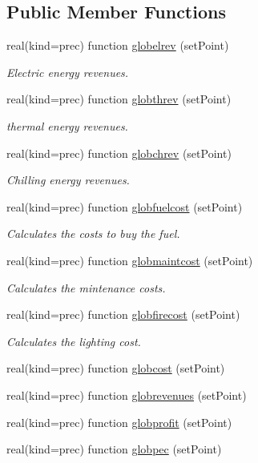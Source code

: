 \subsection*{Public Member Functions}
\begin{DoxyCompactItemize}
\item 
real(kind=prec) function \hyperlink{classglobalresults_ac009a3d3d776d80a58d143c137dd9426}{globelrev} (set\-Point)
\begin{DoxyCompactList}\small\item\em Electric energy revenues. \end{DoxyCompactList}\item 
real(kind=prec) function \hyperlink{classglobalresults_aed1df63c124b3ac76809e37374672f26}{globthrev} (set\-Point)
\begin{DoxyCompactList}\small\item\em thermal energy revenues. \end{DoxyCompactList}\item 
real(kind=prec) function \hyperlink{classglobalresults_a972ef181b25a59b4f9325c85b021149e}{globchrev} (set\-Point)
\begin{DoxyCompactList}\small\item\em Chilling energy revenues. \end{DoxyCompactList}\item 
real(kind=prec) function \hyperlink{classglobalresults_a5e2fcd8b1f2a5d2ffa7be6e316a54d8d}{globfuelcost} (set\-Point)
\begin{DoxyCompactList}\small\item\em Calculates the costs to buy the fuel. \end{DoxyCompactList}\item 
real(kind=prec) function \hyperlink{classglobalresults_a94041d2c7b3dd5969c1abcf1e9546e65}{globmaintcost} (set\-Point)
\begin{DoxyCompactList}\small\item\em Calculates the mintenance costs. \end{DoxyCompactList}\item 
real(kind=prec) function \hyperlink{classglobalresults_aaa04d5674fda6eda87d3896259835080}{globfirecost} (set\-Point)
\begin{DoxyCompactList}\small\item\em Calculates the lighting cost. \end{DoxyCompactList}\item 
real(kind=prec) function \hyperlink{classglobalresults_a0edf7ae83d7b521a5b8f0c4d7b87dddc}{globcost} (set\-Point)
\item 
real(kind=prec) function \hyperlink{classglobalresults_ad14556fe1ddf08129231242d3716028e}{globrevenues} (set\-Point)
\item 
real(kind=prec) function \hyperlink{classglobalresults_afd33ba4d9415e6eba9f99590f55d71a8}{globprofit} (set\-Point)
\item 
real(kind=prec) function \hyperlink{classglobalresults_af9b60fbdefb230d88e9fa328232511a6}{globpec} (set\-Point)
\end{DoxyCompactItemize}


